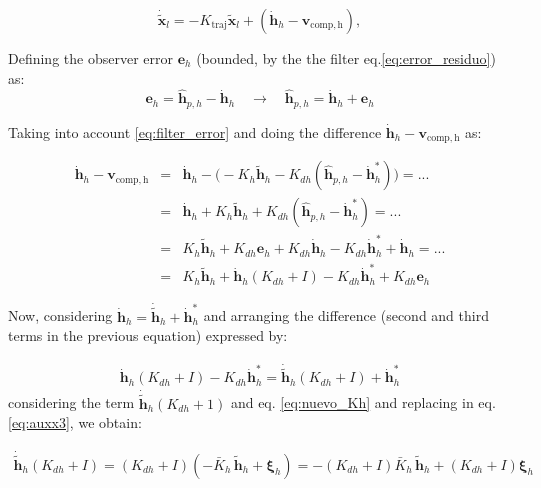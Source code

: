 \documentclass[sn-mathphys-num]{sn-jnl}
\theoremstyle{thmstyleone}%
\theoremstyle{thmstyletwo}%
\theoremstyle{thmstylethree}%
\begin{document}
\begin{equation}
\dot{\tilde{\mathbf{x}}}_{l}
=-K_{\mathrm{traj}}
\tilde{\mathbf{x}}_l
+
(\dot{\mathbf{h}}_h-\mathbf{v}_{\mathrm{comp,h}}),
\label{eq:auxx2}
\end{equation}

Defining the observer error $\mathbf{e}_{h}$ (bounded, by the the filter eq.\eqref{eq:error_residuo}) as:
\begin{equation}
\mathbf{e}_{h}=\hat{\mathbf{h}}_{p,h}-\dot{\mathbf{h}}_h\quad\rightarrow\quad\hat{\mathbf{h}}_{p,h}=\dot{\mathbf{h}}_h+\mathbf{e}_{h} 
\label{eq:filter_error}
\end{equation}

Taking into account \eqref{eq:filter_error} and doing the difference $\dot{\mathbf{h}}_h-\nonumber\mathbf{v}_{\mathrm{comp,h}}$ as:

\begin{eqnarray}
\dot{\mathbf{h}}_h-\nonumber\mathbf{v}_{\mathrm{comp,h}}&=&\dot{\mathbf{h}}_h-\Big(-K_{h}\tilde{\mathbf{h}}_h -K_{dh}(\hat{\mathbf{h}}_{p,h}-\dot{\mathbf{h}}^*_h)\Big)=...\\
\nonumber&=&\dot{\mathbf{h}}_h+K_{h}\tilde{\mathbf{h}}_h +K_{dh}(\hat{\mathbf{h}}_{p,h}-\dot{\mathbf{h}}^*_h)=...\\
\nonumber&=&K_{h}\tilde{\mathbf{h}}_h +K_{dh}\mathbf{e}_{h}+K_{dh}\dot{\mathbf{h}}_{h}-K_{dh}\dot{\mathbf{h}}^*_h+\dot{\mathbf{h}}_h=...\\
&=&K_{h}\tilde{\mathbf{h}}_h +\dot{\mathbf{h}}_h(K_{dh}+I)-K_{dh}\dot{\mathbf{h}}^*_h+K_{dh}\mathbf{e}_{h}
\label{eq:auxx2b}
\end{eqnarray}

Now, considering $\dot{\mathbf{h}}_h=\dot{\tilde{\mathbf{h}}}_h+\dot{\mathbf{h}}^*_h$ and arranging the difference (second and third terms in the previous equation) expressed by:

\begin{eqnarray}
\dot{\mathbf{h}}_h(K_{dh}+I)-K_{dh}\dot{\mathbf{h}}^*_h=\dot{\tilde{\mathbf{h}}}_h(K_{dh}+I)+\dot{\mathbf{h}}^*_h
\label{eq:auxx3}
\end{eqnarray}
considering the term $\dot{\tilde{\mathbf{h}}}_h(K_{dh}+1)$ and eq. \eqref{eq:nuevo_Kh} and replacing in eq.\eqref{eq:auxx3}, we obtain:

\begin{eqnarray}
\dot{\tilde{\mathbf{h}}}_h(K_{dh}+I)=(K_{dh}+I)(-\bar{K}_h\,\tilde{\mathbf{h}}_h + \boldsymbol{\xi}_h)=-(K_{dh}+I)\bar{K}_h\,\tilde{\mathbf{h}}_h +(K_{dh}+I)\boldsymbol{\xi}_h
\label{eq:auxx4}
\end{eqnarray}
\end{document}
